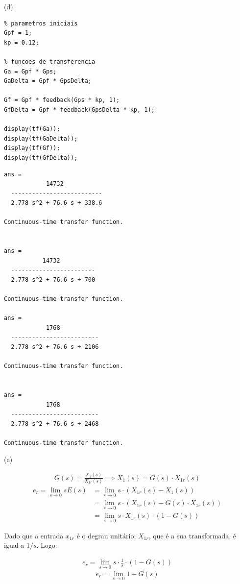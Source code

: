 \documentclass[a4paper,11pt]{article}
\begin{document}
(d)

\begin{lstlisting}
% parametros iniciais
Gpf = 1;
kp = 0.12;

% funcoes de transferencia
Ga = Gpf * Gps;
GaDelta = Gpf * GpsDelta;

Gf = Gpf * feedback(Gps * kp, 1);
GfDelta = Gpf * feedback(GpsDelta * kp, 1);

display(tf(Ga));
display(tf(GaDelta));
display(tf(Gf));
display(tf(GfDelta));
\end{lstlisting}
\begin{lstlisting}
ans =
            14732
  --------------------------
  2.778 s^2 + 76.6 s + 338.6
 
Continuous-time transfer function.


ans =
           14732
  ------------------------
  2.778 s^2 + 76.6 s + 700
 
Continuous-time transfer function.

ans =
            1768
  -------------------------
  2.778 s^2 + 76.6 s + 2106
 
Continuous-time transfer function.


ans =
            1768
  -------------------------
  2.778 s^2 + 76.6 s + 2468
 
Continuous-time transfer function.
\end{lstlisting}

(e)

\begin{gather*}
    G\left(s\right) = \frac{X_1\left(s\right)}{X_{1r}\left(s\right)} \implies
         X_1\left(s\right) = G\left(s\right) \cdot X_{1r}\left(s\right)
\end{gather*}
\begin{align*}
\label{eq:1}
    e_r = \lim_{s\to0} sE\left(s\right) &= \lim_{s\to0} s \cdot \left(X_{1r}
        \left(s\right) - X_1\left(s\right)\right) \\
    &= \lim_{s\to0} s \cdot \left(X_{1r}\left(s\right) - G\left(s\right) \cdot
        X_{1r}\left(s\right)\right) \\
    &= \lim_{s\to0} s \cdot X_{1r}\left(s\right) \cdot
        \left(1 - G\left(s\right)\right)
\end{align*}

Dado que a entrada $x_{1r}$ é o degrau unitário; $X_{1r}$, que é a sua
transformada, é igual a $1/s$. Logo:

\begin{gather*}
    e_r = \lim_{s\to0} s \cdot \frac{1}{s} \cdot
        \left(1 - G\left(s\right)\right)
\end{gather*}
\begin{equation} \label{eq:erro-de-reg}
    e_r = \lim_{s\to0} 1 - G\left(s\right)
\end{equation}
\end{document}
